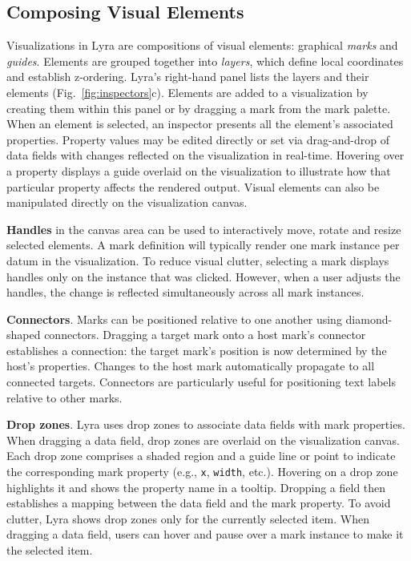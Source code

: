\subsection{Composing Visual Elements}

Visualizations in Lyra are compositions of visual elements: graphical
\emph{marks} and \emph{guides}. Elements are grouped together into
\emph{layers}, which define local coordinates and establish z-ordering. Lyra's
right-hand panel lists the layers and their elements
(Fig.~\ref{fig:inspectors}c). Elements are added to a visualization by creating
them within this panel or by dragging a mark from the mark palette. When an
element is selected, an inspector presents all the element's associated
properties. Property values may be edited directly or set via drag-and-drop of
data fields with changes reflected on the visualization in real-time. Hovering
over a property displays a guide overlaid on the visualization to illustrate how
that particular property affects the rendered output. Visual elements can also
be manipulated directly on the visualization canvas.

\textbf{Handles} in the canvas area can be used to interactively move, rotate
and resize selected elements. A mark definition will typically render one mark
instance per datum in the visualization. To reduce visual clutter, selecting a
mark displays handles only on the instance that was clicked. However, when a
user adjusts the handles, the change is reflected simultaneously across all mark
instances.

\textbf{Connectors}. Marks can be positioned relative to one another using
diamond-shaped connectors. Dragging a target mark onto a host mark's connector
establishes a connection: the target mark's position is now determined by the
host's properties. Changes to the host mark automatically propagate to all
connected targets. Connectors are particularly useful for positioning text
labels relative to other marks.

\textbf{Drop zones}. Lyra uses drop zones to associate data fields with mark
properties. When dragging a data field, drop zones are overlaid on the
visualization canvas. Each drop zone comprises a shaded region and a guide line
or point to indicate the corresponding mark property (e.g., \texttt{x},
\texttt{width}, etc.). Hovering on a drop zone highlights it and shows the
property name in a tooltip. Dropping a field then establishes a mapping between
the data field and the mark property. To avoid clutter, Lyra shows drop zones
only for the currently selected item. When dragging a data field, users can
hover and pause over a mark instance to make it the selected item.

